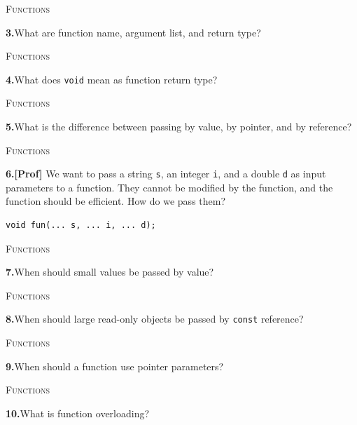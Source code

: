 \documentclass[11pt,a4paper]{article}
\newenvironment{questionblock}{%
  \begin{minipage}[t][0.455\textheight][t]{\textwidth}%
  \raggedright\small
}{%
  \vfill
  \end{minipage}%
}
\newcommand{\sectionlabel}[1]{\textsc{#1}\par\vspace{0.35em}}
\newcommand{\questionnumber}[1]{\textbf{#1.}\enspace}
\begin{document}
\begin{questionblock}
\sectionlabel{Functions}
\questionnumber{3}What are function name, argument list, and return type?\par
\end{questionblock}
\newpage
\begin{questionblock}
\sectionlabel{Functions}
\questionnumber{4}What does \verb|void| mean as function return type?\par
\end{questionblock}
\vspace*{0.04\textheight}
\begin{questionblock}
\sectionlabel{Functions}
\questionnumber{5}What is the difference between passing by value, by pointer, and by reference?\par
\end{questionblock}
\newpage
\begin{questionblock}
\sectionlabel{Functions}
\questionnumber{6}\textbf{[Prof]} We want to pass a string \verb|s|, an integer \verb|i|, and a double \verb|d| as input parameters to a function. They cannot be modified by the function, and the function should be efficient. How do we pass them?\par

\begin{verbatim}
void fun(... s, ... i, ... d);
\end{verbatim}

\end{questionblock}
\vspace*{0.04\textheight}
\begin{questionblock}
\sectionlabel{Functions}
\questionnumber{7}When should small values be passed by value?\par
\end{questionblock}
\newpage
\begin{questionblock}
\sectionlabel{Functions}
\questionnumber{8}When should large read-only objects be passed by \verb|const| reference?\par
\end{questionblock}
\vspace*{0.04\textheight}
\begin{questionblock}
\sectionlabel{Functions}
\questionnumber{9}When should a function use pointer parameters?\par
\end{questionblock}
\newpage
\begin{questionblock}
\sectionlabel{Functions}
\questionnumber{10}What is function overloading?\par
\end{questionblock}
\end{document}
